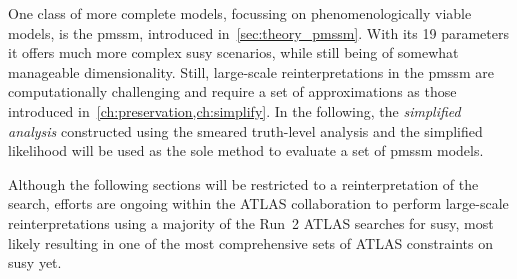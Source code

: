 One class of more complete models, focussing on phenomenologically viable models, is the \gls{pmssm}, introduced in~\cref{sec:theory_pmssm}.
With its 19 parameters it offers much more complex \gls{susy} scenarios, while still being of somewhat manageable dimensionality.
Still, large-scale reinterpretations in the \gls{pmssm} are computationally challenging and require a set of approximations as those introduced in~\cref{ch:preservation,ch:simplify}.
In the following, the \textit{simplified analysis} constructed using the smeared truth-level analysis and the simplified likelihood will be used as the sole method to evaluate a set of \gls{pmssm} models.

Although the following sections will be restricted to a reinterpretation of the \onelepton search, efforts are ongoing within the ATLAS collaboration to perform large-scale reinterpretations using a majority of the Run~2 ATLAS searches for \gls{susy}, most likely resulting in one of the most comprehensive sets of ATLAS constraints on \gls{susy} yet.




